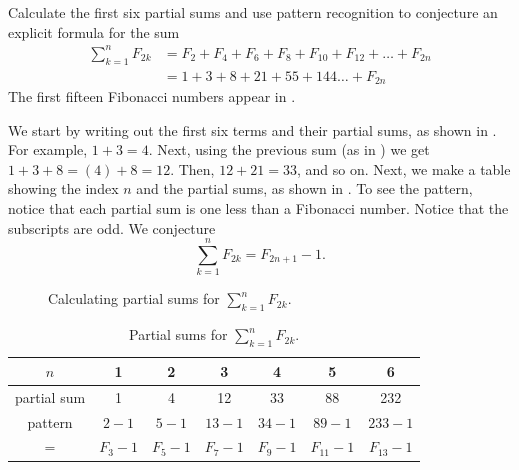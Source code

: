 \begin{exam}
\label{exam_fib_sum_conj_even_index} 
    Calculate the first six partial sums and use pattern recognition to conjecture an explicit formula for the sum
        \begin{align*}
            \sum_{k=1}^nF_{2k} & = F_2+F_4+F_6+F_8+F_{10}+F_{12}+ \ldots +F_{2n} \\
            & = 1+3+8+21+55+144 \ldots +F_{2n} 
        \end{align*}
    The first fifteen Fibonacci numbers appear in .
            \begin{soln}
                We start by writing out the first six terms and their partial sums, as shown in .  For example, $1+3 = 4$.  Next, using the previous sum (as in ) we get $1+3+8 = (4) + 8 = 12$.  Then, $12 + 21 = 33$, and so on. 
                Next, we make a table showing the index $n$ and the partial sums, as shown in .        To see the pattern, notice that each partial sum is one less than a Fibonacci number. Notice that the subscripts are odd. We conjecture
                    $$\sum_{k=1}^nF_{2k}=F_{2n+1}-1.$$
                \end{soln}     
                
                \begin{figure}[hbtp]
                    \centering
                    \scalebox{0.75}{}  
                    \caption{Calculating partial sums for $\displaystyle \sum_{k=1}^nF_{2k}$.}
                    \label{fig_part_sums_fib}
                \end{figure}
                
                \begin{table}[hbtp]
                    \centering
                    \begin{tabular}{c|c|c|c|c|c|c}
                        $n$ & 1 & 2 & 3 & 4 & 5 & 6 \\ \hline
                        partial sum  & 1 & 4 & 12 & 33 & 88 & 232 \\ \hline  
                        pattern & $2-1$ & $5-1$ & $13-1$ & $34-1$ & $89-1$ & $233-1$ \\
                        $=$ & $F_3-1$ & $F_5-1$ & $F_7-1$ & $F_9-1$ & $F_{11}-1$ & $F_{13}-1$\\
                    \end{tabular}
                    \caption{Partial sums for $\displaystyle \sum_{k=1}^nF_{2k}$.}
                    \label{tab_partial_sums_fib}
                \end{table}
\end{exam}

